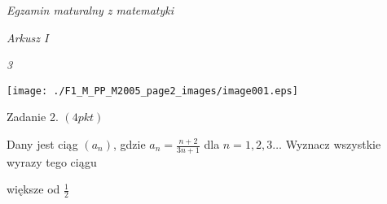 \documentclass[a4paper,12pt]{article}
\begin{document}
{\it Egzamin maturalny z matematyki}

{\it Arkusz I}

{\it 3}
\begin{center}
\texttt{[image: ./F1\_M\_PP\_M2005\_page2\_images/image001.eps]}
\end{center}
Zadanie 2. $(4pkt)$

Dany jest ciąg $(a_{n})$, gdzie $a_{n}=\displaystyle \frac{n+2}{3n+1}$ dla $ n=1,2,3\ldots$ Wyznacz wszystkie wyrazy tego ciągu

większe od $\displaystyle \frac{1}{2}$
\end{document}

